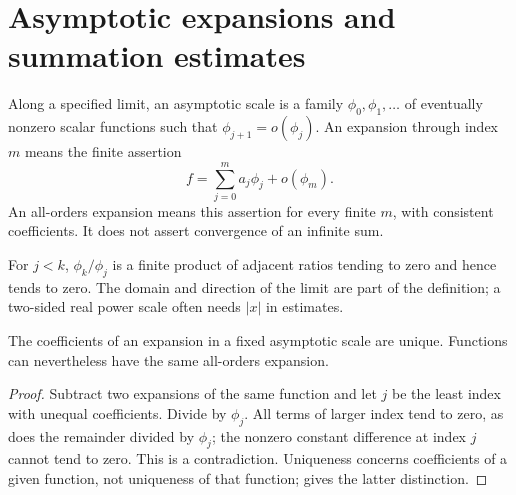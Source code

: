 \chapter{Asymptotic expansions and summation estimates}
\label{module:M03.17}

\begin{definition}
Along a specified limit, an asymptotic scale is a family $\phi_0,\phi_1,\ldots$
of eventually nonzero scalar functions such that $\phi_{j+1}=o(\phi_j)$.
An expansion through index $m$ means the finite assertion
\[
 f=\sum_{j=0}^{m}a_j\phi_j+o(\phi_m).
\]
An all-orders expansion means this assertion for every finite $m$, with
consistent coefficients. It does not assert convergence of an infinite sum.
\end{definition}
For $j<k$, $\phi_k/\phi_j$ is a finite product of adjacent ratios tending to
zero and hence tends to zero. The domain and direction of the limit are part
of the definition; a two-sided real power scale often needs $|x|$ in estimates.

\begin{proposition}
The coefficients of an expansion in a fixed asymptotic scale are unique.
Functions can nevertheless have the same all-orders expansion.
\end{proposition}
\begin{proof}
Subtract two expansions of the same function and let $j$ be the least index
with unequal coefficients. Divide by $\phi_j$. All terms of larger index
tend to zero, as does the remainder divided by $\phi_j$; the nonzero constant
difference at index $j$ cannot tend to zero. This is a contradiction.
Uniqueness concerns coefficients of a given function, not uniqueness of that
function;  gives the latter distinction.
\end{proof}

